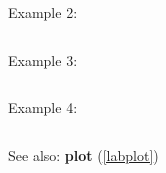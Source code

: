 \noindent Example 2: 
\begin{center}\begin{minipage}{15cm}\begin{Verbatim}[frame=single]
\end{Verbatim}
\end{minipage}\end{center}
\noindent Example 3: 
\begin{center}\begin{minipage}{15cm}\begin{Verbatim}[frame=single]
\end{Verbatim}
\end{minipage}\end{center}
\noindent Example 4: 
\begin{center}\begin{minipage}{15cm}\begin{Verbatim}[frame=single]
\end{Verbatim}
\end{minipage}\end{center}
See also: \textbf{plot} (\ref{labplot})
